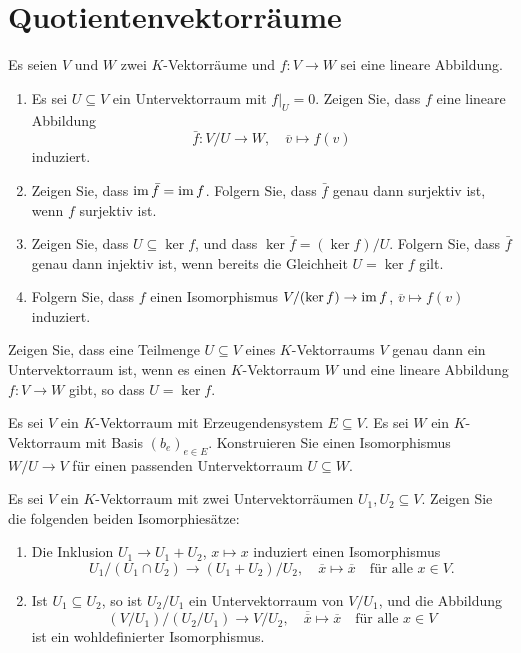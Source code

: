 \section{Quotientenvektorräume}


\begin{question}
  Es seien $V$ und $W$ zwei $K$-Vektorräume und $f \colon V \to W$ sei eine lineare Abbildung.
  \begin{enumerate}[leftmargin=*]
    \item
      Es sei $U \subseteq V$ ein Untervektorraum mit $f|_U = 0$.
      Zeigen Sie, dass $f$ eine lineare Abbildung
      \[
        \bar{f} \colon V\!/U \to W,
        \quad
        \overline{v} \mapsto f(v)
      \]
      induziert.
    \item
      Zeigen Sie, dass $\operatorname{im} \bar{f} = \operatorname{im} f$.
      Folgern Sie, dass $\bar{f}$ genau dann surjektiv ist, wenn $f$ surjektiv ist.
    \item
      Zeigen Sie, dass $U \subseteq \ker f$, und dass $\ker \bar{f} = (\ker f)/U$.
      Folgern Sie, dass $\bar{f}$ genau dann injektiv ist, wenn bereits die Gleichheit $U = \ker f$ gilt.
    \item
      Folgern Sie, dass $f$ einen Isomorphismus $V/(\ker f) \to \operatorname{im} f$, $\overline{v} \mapsto f(v)$ induziert.
  \end{enumerate}
\end{question}


\begin{question}
  Zeigen Sie, dass eine Teilmenge $U \subseteq V$ eines $K$-Vektorraums $V$ genau dann ein Untervektorraum ist, wenn es einen $K$-Vektorraum $W$ und eine lineare Abbildung $f \colon V \to W$ gibt, so dass $U = \ker f$.
\end{question}


\begin{question}
  Es sei $V$ ein $K$-Vektorraum mit Erzeugendensystem $E \subseteq V$.
  Es sei $W$ ein $K$-Vektorraum mit Basis $(b_e)_{e \in E}$.
  Konstruieren Sie einen Isomorphismus $W\!/U \to V$ für einen passenden Untervektorraum $U \subseteq W$.
\end{question}


\begin{question}
  Es sei $V$ ein $K$-Vektorraum mit zwei Untervektorräumen $U_1, U_2 \subseteq V$.
  Zeigen Sie die folgenden beiden Isomorphiesätze:
  \begin{enumerate}[leftmargin=*]
    \item
      Die Inklusion $U_1 \to U_1 + U_2$, $x \mapsto x$ induziert einen Isomorphismus
      \[
        U_1 / (U_1 \cap U_2) \to (U_1 + U_2) / U_2,
        \quad
        \overline{x} \mapsto \overline{x}
        \quad
        \text{für alle $x \in V$}.
      \]
    \item
      Ist $U_1 \subseteq U_2$, so ist $U_2 / U_1$ ein Untervektorraum von $V / U_1$, und die Abbildung
      \[
        (V \! / U_1) / (U_2 / U_1) \to V \! / U_2,
        \quad
        \overline{\overline{x}} \mapsto \overline{x}
        \quad
        \text{für alle $x \in V$}
      \]
      ist ein wohldefinierter Isomorphismus.
  \end{enumerate}
\end{question}


